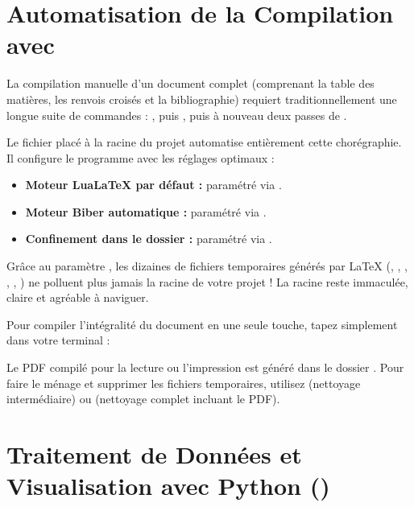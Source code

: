 \section{Automatisation de la Compilation avec }
\label{sec:compilation-latexmkrc}

La compilation manuelle d'un document complet (comprenant la table des matières,
les renvois croisés et la bibliographie) requiert traditionnellement une longue suite de commandes :
, puis , puis à nouveau deux passes de .

Le fichier  placé à la racine du projet automatise entièrement cette chorégraphie.
Il configure le programme  avec les réglages optimaux :
\begin{itemize}
  \item \textbf{Moteur Lua\LaTeX{} par défaut :} paramétré via .
  \item \textbf{Moteur Biber automatique :} paramétré via .
  \item \textbf{Confinement dans le dossier  :} paramétré via .
\end{itemize}

\begin{callout}
Grâce au paramètre , les dizaines de fichiers temporaires générés par \LaTeX{}
(, , , , , )
ne polluent plus jamais la racine de votre projet !
La racine reste immaculée, claire et agréable à naviguer.
\end{callout}

Pour compiler l'intégralité du document en une seule touche, tapez simplement dans votre terminal :
\begin{center}
\end{center}
Le PDF compilé pour la lecture ou l'impression est généré dans le dossier .
Pour faire le ménage et supprimer les fichiers temporaires, utilisez  (nettoyage intermédiaire)
ou  (nettoyage complet incluant le PDF).

\section{Traitement de Données et Visualisation avec Python ()}
\label{sec:python-pipeline}


